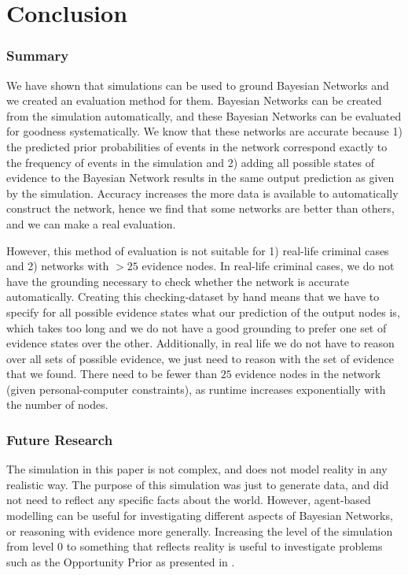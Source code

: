 \documentclass[12pt]{article}
\begin{document}
\section{Conclusion}

\subsubsection{Summary}
We have shown that simulations can be used to ground Bayesian Networks and we created an evaluation method for them. Bayesian Networks can be created from the simulation automatically, and these Bayesian Networks can be evaluated for goodness systematically. We know that these networks are accurate because 1) the predicted prior probabilities of events in the network correspond exactly to the frequency of events in the simulation and 2) adding all possible states of evidence to the Bayesian Network results in the same output prediction as given by the simulation. Accuracy increases the more data is available to automatically construct the network, hence we find that some networks are better than others, and we can make a real evaluation.

 However, this method of evaluation is not suitable for 1) real-life criminal cases and 2) networks with $> 25$ evidence nodes. In real-life criminal cases, we do not have the grounding necessary to check whether the network is accurate automatically. Creating this checking-dataset by hand means that we have to specify for all possible evidence states what our prediction of the output nodes is, which takes too long and we do not have a good grounding to prefer one set of evidence states over the other. Additionally, in real life we do not have to reason over all sets of possible evidence, we just need to reason with the set of evidence that we found. There need to be fewer than $25$ evidence nodes in the network (given personal-computer constraints), as runtime increases exponentially with the number of nodes.

 
\subsubsection{Future Research}

The simulation in this paper is not complex, and does not model reality in any realistic way. The purpose of this simulation was just to generate data, and did not need to reflect any specific facts about the world. However, agent-based modelling can be useful for investigating different aspects of Bayesian Networks, or reasoning with evidence more generally. Increasing the level of the simulation from level 0 to something that reflects reality is useful to investigate problems such as the Opportunity Prior as presented in \citet{Fenton2017}. 
\end{document}
